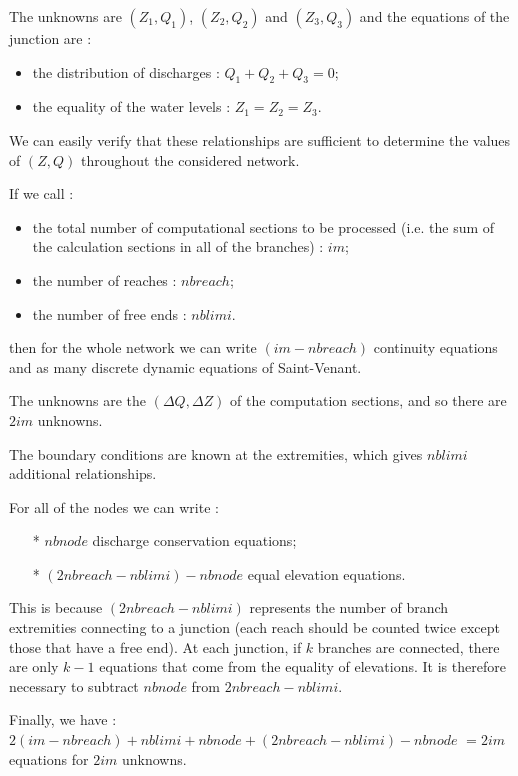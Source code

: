 The unknowns are $(Z_1,Q_1)$, $(Z_2,Q_2)$ and $(Z_3,Q_3)$ and the equations of the junction are :
\begin{itemize}
 \item the distribution of discharges : $Q_1 + Q_2 + Q_3 = 0$;
 \item the equality of the water levels : $Z_1 = Z_2 = Z_3$.
\end{itemize}

We can easily verify that these relationships are sufficient to determine the values of $(Z,Q)$ throughout the considered network.

If we call :
\begin{itemize}
 \item the total number of computational sections to be processed (i.e. the sum of the calculation sections in all of the branches) : $im$;
 \item the number of reaches : $nbreach$;
 \item the number of free ends : $nblimi$.
\end{itemize}

then for the whole network we can write $(im-nbreach)$ continuity equations and as many discrete dynamic equations of Saint-Venant.

The unknowns are the $(\Delta Q,\Delta Z)$ of the computation sections, and so there are $2 im$ unknowns.

The boundary conditions are known at the extremities, which gives $nblimi$ additional relationships.

For all of the nodes we can write :
\begin{itemize}
 \item[*] $nbnode$ discharge conservation equations;
 \item[*] $(2nbreach-nblimi) - nbnode$ equal elevation equations.
\end{itemize}

This is because $(2nbreach - nblimi)$ represents the number of branch extremities connecting to a junction (each reach should be counted twice except those that have a free end). At each junction, if $k$ branches are connected, there are only $k-1$ equations that come from the equality of elevations. It is therefore necessary to subtract $nbnode$ from $2nbreach - nblimi$.

Finally, we have : \\
$2 (im - nbreach) + nblimi + nbnode + (2 nbreach - nblimi) - nbnode$
$= 2 im$ equations for $2 im$ unknowns.


